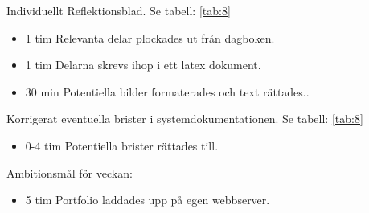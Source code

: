 \documentclass{TDP003mall}
\begin{document}
Individuellt Reflektionsblad. Se tabell: \ref{tab:8}
\begin{itemize}
\item 1 tim Relevanta delar plockades ut från dagboken.
  \item 1 tim Delarna skrevs ihop i ett latex dokument.
  \item 30 min Potentiella bilder formaterades och text rättades..
\end{itemize}
  
  Korrigerat eventuella brister i systemdokumentationen. Se tabell: \ref{tab:8}
\begin{itemize}
  \item 0-4 tim Potentiella brister rättades till.
\end{itemize}

Ambitionsmål för veckan:
\begin{itemize}
  \item 5 tim Portfolio laddades upp på egen webbserver.
\end{itemize}
\end{document}
